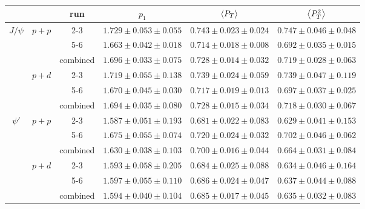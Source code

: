 \begin{tabular}{cc|c|c|c|c}
\hline
                      &                        & run      & $p_1$                   & $\expval{P_T}$          & $\expval{P^2_T}$        \\ \hline
\multicolumn{1}{c|}{\multirow{6}{*}{$J/\psi$}} & \multirow{3}{*}{$p+p$} & 2-3 & $1.729\pm0.053\pm0.055$ & $0.743\pm0.023\pm0.024$ & $0.747\pm0.046\pm0.048$ \\ \cline{3-6} 
\multicolumn{1}{c|}{} &                        & 5-6      & $1.663\pm0.042\pm0.018$ & $0.714\pm0.018\pm0.008$ & $0.692\pm0.035\pm0.015$ \\ \cline{3-6} 
\multicolumn{1}{c|}{} &                        & combined & $1.696\pm0.033\pm0.075$ & $0.728\pm0.014\pm0.032$ & $0.719\pm0.028\pm0.063$ \\ \cline{2-6} 
\multicolumn{1}{c|}{} & \multirow{3}{*}{$p+d$} & 2-3      & $1.719\pm0.055\pm0.138$ & $0.739\pm0.024\pm0.059$ & $0.739\pm0.047\pm0.119$ \\ \cline{3-6} 
\multicolumn{1}{c|}{} &                        & 5-6      & $1.670\pm0.045\pm0.030$ & $0.717\pm0.019\pm0.013$ & $0.697\pm0.037\pm0.025$ \\ \cline{3-6} 
\multicolumn{1}{c|}{} &                        & combined & $1.694\pm0.035\pm0.080$ & $0.728\pm0.015\pm0.034$ & $0.718\pm0.030\pm0.067$ \\ \hline
\multicolumn{1}{c|}{\multirow{6}{*}{$\psi'$}}  & \multirow{3}{*}{$p+p$} & 2-3 & $1.587\pm0.051\pm0.193$ & $0.681\pm0.022\pm0.083$ & $0.629\pm0.041\pm0.153$ \\ \cline{3-6} 
\multicolumn{1}{c|}{} &                        & 5-6      & $1.675\pm0.055\pm0.074$ & $0.720\pm0.024\pm0.032$ & $0.702\pm0.046\pm0.062$ \\ \cline{3-6} 
\multicolumn{1}{c|}{} &                        & combined & $1.630\pm0.038\pm0.103$ & $0.700\pm0.016\pm0.044$ & $0.664\pm0.031\pm0.084$ \\ \cline{2-6} 
\multicolumn{1}{c|}{} & \multirow{3}{*}{$p+d$} & 2-3      & $1.593\pm0.058\pm0.205$ & $0.684\pm0.025\pm0.088$ & $0.634\pm0.046\pm0.164$ \\ \cline{3-6} 
\multicolumn{1}{c|}{} &                        & 5-6      & $1.597\pm0.055\pm0.110$ & $0.686\pm0.024\pm0.047$ & $0.637\pm0.044\pm0.088$ \\ \cline{3-6} 
\multicolumn{1}{c|}{} &                        & combined & $1.594\pm0.040\pm0.104$ & $0.685\pm0.017\pm0.045$ & $0.635\pm0.032\pm0.083$ \\ \hline
\end{tabular}
